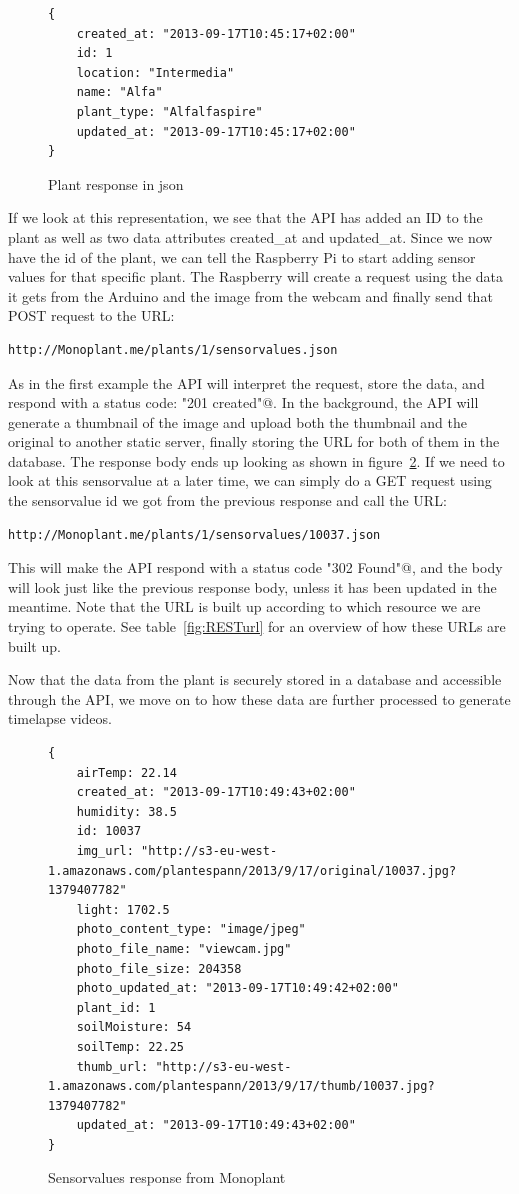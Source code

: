\begin{figure}
	\begin{lstlisting}[style=htmlcssjs]
{
	created_at: "2013-09-17T10:45:17+02:00"
	id: 1
	location: "Intermedia"
	name: "Alfa"
	plant_type: "Alfalfaspire"
	updated_at: "2013-09-17T10:45:17+02:00"
}
	\end{lstlisting}
	\caption{Plant response in json}
	\label{fig:plantresponse}
\end{figure}

If we look at this representation, we see that the API has added an ID to the plant as well as two data attributes created\_at and updated\_at. Since we now have the id of the plant, we can tell the Raspberry Pi to start adding sensor values for that specific plant. The Raspberry will create a request using the data it gets from the Arduino and the image from the webcam and finally send that POST request to the URL:\begin{verbatim}http://Monoplant.me/plants/1/sensorvalues.json \end{verbatim}

As in the first example the API will interpret the request, store the data, and respond with a status code: \verb@"201 created"@. In the background, the API will generate a thumbnail of the image and upload both the thumbnail and the original to another static server, finally storing the URL for both of them in the database. The response body ends up looking as shown in figure~\ref{fig:sensorvaluesresponse}. If we need to look at this sensorvalue at a later time, we can simply do a GET request using the sensorvalue id we got from the previous response and call the URL:\begin{verbatim}http://Monoplant.me/plants/1/sensorvalues/10037.json \end{verbatim} This will make the API respond with a status code \verb@"302 Found"@, and the body will look just like the previous response body, unless it has been updated in the meantime. Note that the URL is built up according to which resource we are trying to operate. See table~\ref{fig:RESTurl} for an overview of how these URLs are built up.

Now that the data from the plant is securely stored in a database and accessible through the API, we move on to how these data are further processed to generate timelapse videos. 

\begin{figure}
	\begin{lstlisting}[style=htmlcssjs]
{
	airTemp: 22.14
	created_at: "2013-09-17T10:49:43+02:00"
	humidity: 38.5
	id: 10037
	img_url: "http://s3-eu-west-1.amazonaws.com/plantespann/2013/9/17/original/10037.jpg?1379407782"
	light: 1702.5
	photo_content_type: "image/jpeg"
	photo_file_name: "viewcam.jpg"
	photo_file_size: 204358
	photo_updated_at: "2013-09-17T10:49:42+02:00"
	plant_id: 1
	soilMoisture: 54
	soilTemp: 22.25
	thumb_url: "http://s3-eu-west-1.amazonaws.com/plantespann/2013/9/17/thumb/10037.jpg?1379407782"
	updated_at: "2013-09-17T10:49:43+02:00"
}
	\end{lstlisting}
	\caption{Sensorvalues response from Monoplant}
	\label{fig:sensorvaluesresponse}
\end{figure}



